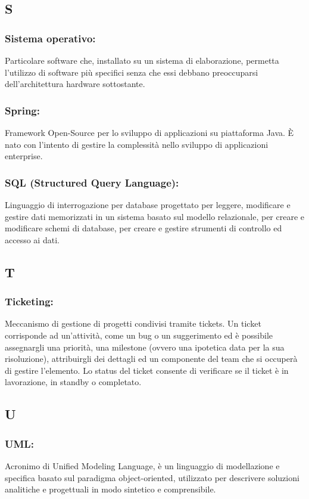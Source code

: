 \subsection*{\huge{S}}
\subsubsection*{Sistema operativo:} Particolare software che, installato su un
sistema di elaborazione, permetta l'utilizzo di software pi\`u specifici senza che
essi debbano preoccuparsi dell'architettura hardware sottostante.

\subsubsection*{Spring:} Framework Open-Source per lo sviluppo di applicazioni
su piattaforma Java. \`E nato con l'intento di gestire la complessit\`a nello
sviluppo di applicazioni enterprise.

\subsubsection*{SQL (Structured Query Language):} Linguaggio di
interrogazione per database progettato per leggere, modificare e gestire dati
memorizzati in un sistema basato sul modello relazionale, per creare e
modificare schemi di database, per creare e gestire strumenti di controllo ed
accesso ai dati.

\subsection*{\huge{T}}
\subsubsection*{Ticketing:} Meccanismo di gestione di progetti condivisi tramite
tickets. Un ticket corrisponde ad un'attivit\`a, come un bug o un suggerimento
ed \`e possibile assegnargli una priorit\`a, una milestone (ovvero una ipotetica
data per la sua risoluzione), attribuirgli dei dettagli ed un componente del
team che si occuper\`a di gestire l'elemento. Lo status del ticket consente di
verificare se il ticket \`e in lavorazione, in standby o completato.

\subsection*{\huge{U}}
\subsubsection*{UML:} Acronimo di Unified Modeling Language, \`e un linguaggio
di modellazione e specifica basato sul paradigma object-oriented, utilizzato per
descrivere soluzioni analitiche e progettuali in modo sintetico e comprensibile.

